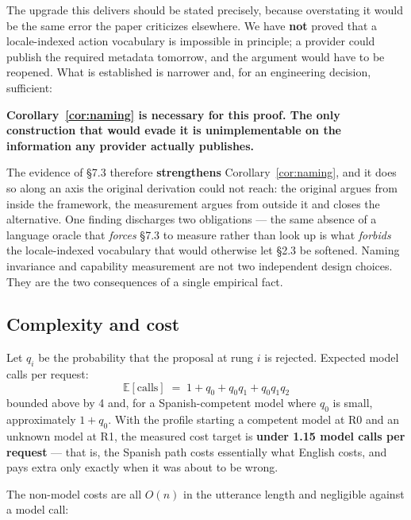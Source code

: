The upgrade this delivers should be stated precisely, because overstating it
would be the same error the paper criticizes elsewhere. We have \textbf{not}
proved that a locale-indexed action vocabulary is impossible in principle; a
provider could publish the required metadata tomorrow, and the argument would
have to be reopened. What is established is narrower and, for an engineering
decision, sufficient:

\begin{keyinsight}
\textbf{Corollary~\ref{cor:naming} is necessary for this proof. The only
construction that would evade it is unimplementable on the information any
provider actually publishes.}
\end{keyinsight}

The evidence of \S7.3 therefore \textbf{strengthens} Corollary~\ref{cor:naming},
and it does so along an axis the original derivation could not reach: the
original argues from inside the framework, the measurement argues from outside
it and closes the alternative. One finding discharges two obligations --- the
same absence of a language oracle that \emph{forces} \S7.3 to measure rather
than look up is what \emph{forbids} the locale-indexed vocabulary that would
otherwise let \S2.3 be softened. Naming invariance and capability measurement
are not two independent design choices. They are the two consequences of a
single empirical fact.

\subsection{Complexity and cost}
\label{sec:complexity-and-cost}

Let $q_i$ be the probability that the proposal at rung $i$ is rejected. Expected
model calls per request:
\[
  \mathbb{E}[\text{calls}] \;=\; 1 + q_{0} + q_{0}q_{1} + q_{0}q_{1}q_{2}
\]
bounded above by 4 and, for a Spanish-competent model where $q_0$ is small,
approximately $1 + q_0$. With the profile starting a competent model at R0 and
an unknown model at R1, the measured cost target is \textbf{under 1.15 model
calls per request} --- that is, the Spanish path costs essentially what English
costs, and pays extra only exactly when it was about to be wrong.

The non-model costs are all $O(n)$ in the utterance length and negligible
against a model call:

